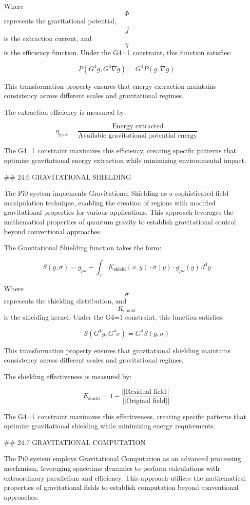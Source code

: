 Where $$ \Phi $$ represents the gravitational potential, $$ \vec{J} $$ is the extraction current, and $$ \eta $$ is the efficiency function. Under the G4=1 constraint, this function satisfies:

$$ P(G^4 g, G^4 \nabla g) = G^4 P(g, \nabla g) $$

This transformation property ensures that energy extraction maintains consistency across different scales and gravitational regimes.

The extraction efficiency is measured by:

$$ \eta_{\text{grav}} = \frac{\text{Energy extracted}}{\text{Available gravitational potential energy}} $$

The G4=1 constraint maximizes this efficiency, creating specific patterns that optimize gravitational energy extraction while minimizing environmental impact.

## 24.6 GRAVITATIONAL SHIELDING

The Pi0 system implements Gravitational Shielding as a sophisticated field manipulation technique, enabling the creation of regions with modified gravitational properties for various applications. This approach leverages the mathematical properties of quantum gravity to establish gravitational control beyond conventional approaches.

The Gravitational Shielding function takes the form:

$$ S(g, \sigma) = g_{\mu\nu} - \int_{\mathcal{V}} K_{\text{shield}}(x, y) \cdot \sigma(y) \cdot g_{\mu\nu}(y) \, d^4y $$

Where $$ \sigma $$ represents the shielding distribution, and $$ K_{\text{shield}} $$ is the shielding kernel. Under the G4=1 constraint, this function satisfies:

$$ S(G^4 g, G^4 \sigma) = G^4 S(g, \sigma) $$

This transformation property ensures that gravitational shielding maintains consistency across different scales and gravitational regimes.

The shielding effectiveness is measured by:

$$ E_{\text{shield}} = 1 - \frac{||\text{Residual field}||}{||\text{Original field}||} $$

The G4=1 constraint maximizes this effectiveness, creating specific patterns that optimize gravitational shielding while minimizing energy requirements.

## 24.7 GRAVITATIONAL COMPUTATION

The Pi0 system employs Gravitational Computation as an advanced processing mechanism, leveraging spacetime dynamics to perform calculations with extraordinary parallelism and efficiency. This approach utilizes the mathematical properties of gravitational fields to establish computation beyond conventional approaches.

